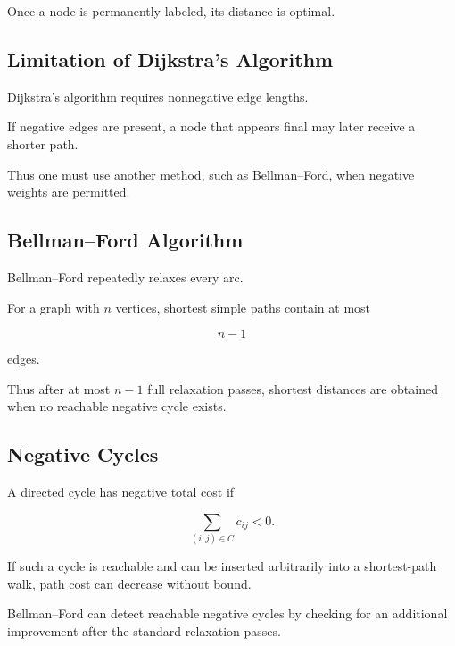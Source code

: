 Once a node is permanently labeled, its distance is optimal.

\subsection{Limitation of Dijkstra's Algorithm}
\label{subsec:dijkstra-limitation}

Dijkstra's algorithm requires nonnegative edge lengths.

If negative edges are present, a node that appears final may later receive
a shorter path.

Thus one must use another method, such as Bellman--Ford, when negative
weights are permitted.

\subsection{Bellman--Ford Algorithm}
\label{subsec:bellman-ford-network}

Bellman--Ford repeatedly relaxes every arc.

For a graph with \(n\) vertices, shortest simple paths contain at most

\[
n-1
\]

edges.

Thus after at most \(n-1\) full relaxation passes, shortest distances are
obtained when no reachable negative cycle exists.

\subsection{Negative Cycles}
\label{subsec:negative-cycles}

A directed cycle has negative total cost if

\[
\boxed{
\sum_{(i,j)\in C}
c_{ij}
<
0.
}
\]

If such a cycle is reachable and can be inserted arbitrarily into a
shortest-path walk, path cost can decrease without bound.

Bellman--Ford can detect reachable negative cycles by checking for an
additional improvement after the standard relaxation passes.


